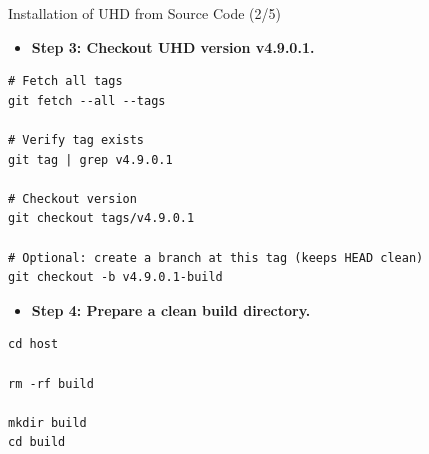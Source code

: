\begin{frame}[fragile]{Installation of UHD from Source Code (2/5)}

\footnotesize

\begin{itemize}
    \item \textbf{Step 3: Checkout UHD version v4.9.0.1.}
\end{itemize}

\scriptsize
\begin{Verbatim}[xleftmargin=3.8em,breaklines,breaksymbolleft={},breaksymbolright={}]
# Fetch all tags
git fetch --all --tags

# Verify tag exists
git tag | grep v4.9.0.1

# Checkout version
git checkout tags/v4.9.0.1

# Optional: create a branch at this tag (keeps HEAD clean)
git checkout -b v4.9.0.1-build
\end{Verbatim}

\footnotesize

\begin{itemize}
    \item \textbf{Step 4: Prepare a clean build directory.}
\end{itemize}

\scriptsize
\begin{Verbatim}[xleftmargin=3.8em,breaklines,breaksymbolleft={},breaksymbolright={}]
cd host

rm -rf build

mkdir build
cd build
\end{Verbatim}

\end{frame}